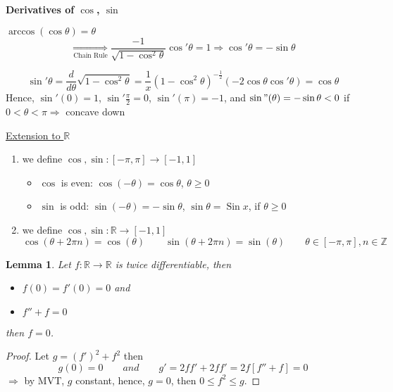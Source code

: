 \documentclass[12pt]{article}
\theoremstyle{plain}
\newtheorem{lemma}{Lemma}[subsection]
\newcommand{\mR}{{\mathbb{R}}}
\newcommand{\mZ}{{\mathbb{Z}}}
\DeclareMathOperator{\Sin}{Sin}
\begin{document}
	\textbf{Derivatives of $\cos$, $\sin$}
	
	$\arccos (\cos \theta) = \theta$
	\[
		\underset{\text{Chain Rule}} {\Rightarrow}
		\frac{-1}{\sqrt{1-\cos^2 \theta}} \cos '\theta=1
		\Rightarrow \cos'\theta = -\sin \theta
	\]
	
	\[
		\sin'\theta = \frac d{d\theta} \sqrt{1-\cos^2\theta} 
		= \frac1x(1-\cos^2 \theta) ^{-\frac12} (-2\cos \theta \cos'\theta)
		= \cos \theta
	\]
	Hence, $\sin'(0)=1$, $\sin'\frac{\pi}2 = 0$, $\sin'(\pi) = -1$, and 
	$\sin"(\theta) = -\sin \theta < 0$ if $0<\theta < \pi \Rightarrow$
	concave down

	\underline{Extension to $\mR$} 
	\begin{enumerate}[label=(\alph*)]
		\item we define $\cos, \sin:[-\pi,\pi] \to [-1,1]$
			\begin{itemize}
				\item $\cos$ is even: $\cos (-\theta) = \cos \theta$,
				$\theta \geq 0$
				\item $\sin$ is odd: $\sin(-\theta) = -\sin \theta$, 
					$\sin \theta = \Sin x$, if $\theta \geq 0$ 
			\end{itemize}
		\item we define $\cos, \sin : \mR \to [-1, 1]$
			\[
				\cos(\theta + 2\pi n) = \cos(\theta)
				\qquad 
				\sin (\theta + 2\pi n) = \sin(\theta)
				\qquad 
				\theta \in [-\pi, \pi], n \in \mZ
			\]
	\end{enumerate}

	\begin{lemma}
		Let $f: \mR \to \mR$ is twice differentiable, then 
		\begin{itemize}
			\item $f(0) = f'(0) = 0$ and 
			\item $f''+f=0$
		\end{itemize}
		then $f=0$. 
	\end{lemma}
	\begin{proof}
		Let $g=(f')^2 + f^2$ then
		\[
			g(0)=0 \qquad and \qquad 
			g'= 2ff'+ 2ff'=2f[f''+f] = 0
		\]
		$\Rightarrow$ by MVT, $g$ constant, hence, $g=0$, 
		then $0\leq f^2 \leq g$. 
	\end{proof}
\end{document}
